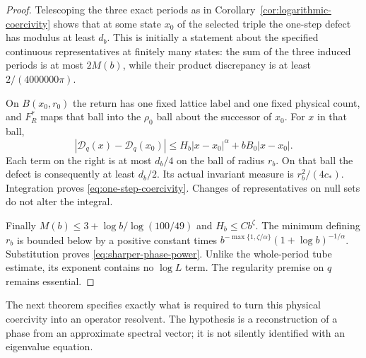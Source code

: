 \begin{proof}
Telescoping the three exact periods as in
Corollary~\ref{cor:logarithmic-coercivity} shows that at some state $x_0$
of the selected triple the one-step defect has modulus at least $d_b$.
This is initially a statement about the specified continuous
representatives at finitely many states: the sum of the three induced
periods is at most $2M(b)$, while their product discrepancy is at least
$2/(4000000\pi)$.

On $B(x_0,r_0)$ the return has one fixed lattice label and one fixed
physical count, and $F_R^*$ maps that ball into the $\rho_0$ ball about
the successor of $x_0$. For $x$ in that ball,
\[
 |\mathcal D_q(x)-\mathcal D_q(x_0)|
 \le H_b|x-x_0|^\alpha+bB_0|x-x_0|.
\]
Each term on the right is at most $d_b/4$ on the ball of radius
$r_b$. On that ball the defect
is consequently at least $d_b/2$. Its actual invariant measure is
$r_b^2/(4c_*)$. Integration proves \eqref{eq:one-step-coercivity}.
Changes of representatives on null sets do not alter the integral.

Finally $M(b)\le3+\log b/\log(100/49)$ and
$H_b\le C b^\zeta$. The minimum defining $r_b$ is bounded
below by a positive constant times
$b^{-\max\{1,\zeta/\alpha\}}(1+\log b)^{-1/\alpha}$.
Substitution proves \eqref{eq:sharper-phase-power}. Unlike the
whole-period tube estimate, its exponent contains no $\log L$ term.
The regularity premise on $q$ remains essential.
\end{proof}

The next theorem specifies exactly what is required to turn this
physical coercivity into an operator resolvent. The hypothesis is a
reconstruction of a phase from an approximate spectral vector; it is
not silently identified with an eigenvalue equation.

